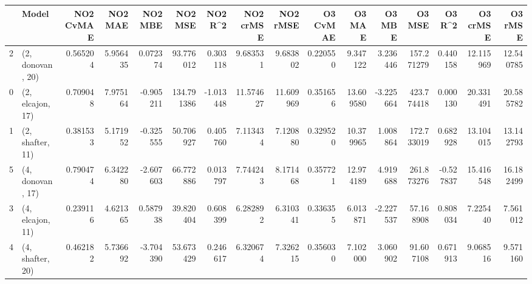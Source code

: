 \begin{tabular}{llrrrrrrrrrrrrrr}
\toprule
{} &             Model &  NO2 CvMAE &   NO2 MAE &   NO2 MBE &     NO2 MSE &   NO2 R\textasciicircum2 &  NO2 crMSE &   NO2 rMSE &  O3 CvMAE &     O3 MAE &    O3 MBE &      O3 MSE &    O3 R\textasciicircum2 &   O3 crMSE &    O3 rMSE \\
\midrule
2 &  (2, donovan, 20) &   0.565204 &  5.956435 &  0.072374 &   93.776012 &  0.303118 &   9.683531 &   9.683802 &  0.220550 &   9.347122 &  3.236446 &  157.271279 &  0.440158 &  12.115969 &  12.540785 \\
0 &  (2, elcajon, 17) &   0.709048 &  7.975164 & -0.905211 &  134.791386 & -1.013448 &  11.574627 &  11.609969 &  0.351656 &  13.609580 & -3.225664 &  423.774418 &  0.000130 &  20.331491 &  20.585782 \\
1 &  (2, shafter, 11) &   0.381533 &  5.171952 & -0.325555 &   50.706927 &  0.405760 &   7.113434 &   7.120880 &  0.329520 &  10.379965 &  1.008864 &  172.733019 &  0.682928 &  13.104015 &  13.142793 \\
5 &  (4, donovan, 17) &   0.790474 &  6.342280 & -2.607603 &   66.772886 &  0.013797 &   7.744243 &   8.171468 &  0.357721 &  12.974189 &  4.919688 &  261.873276 & -0.527837 &  15.416548 &  16.182499 \\
3 &  (4, elcajon, 11) &   0.239116 &  4.621365 &  0.587938 &   39.820404 &  0.608399 &   6.282892 &   6.310341 &  0.336355 &   6.013871 & -2.227537 &   57.168908 &  0.808034 &   7.225440 &   7.561012 \\
4 &  (4, shafter, 20) &   0.462182 &  5.736692 & -3.704390 &   53.673429 &  0.246617 &   6.320674 &   7.326215 &  0.356030 &   7.102000 &  3.060902 &   91.607108 &  0.671913 &   9.068516 &   9.571160 \\
\bottomrule
\end{tabular}
